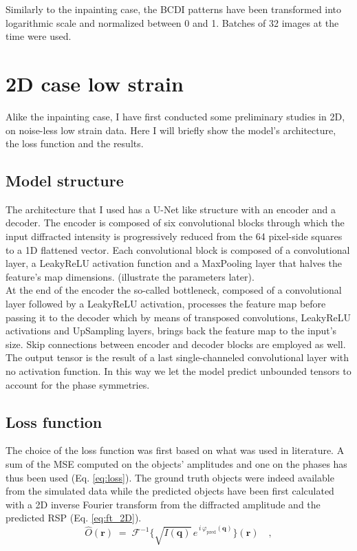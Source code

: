 Similarly to the inpainting case, the BCDI patterns have been transformed into logarithmic scale and normalized between 
0 and 1. Batches of 32 images at the time were used. 

\section{2D case low strain}\label{chp:2d_nostrain}
Alike the inpainting case, I have first conducted some preliminary studies in 2D, on noise-less low strain data. Here I will 
briefly show the model's architecture, the loss function and the results. 
\subsection{Model structure}
The architecture that I used has a U-Net like structure with an encoder and a decoder. 
The encoder is composed of six convolutional blocks through which the input diffracted intensity is progressively 
reduced from the 64 pixel-side squares to a 1D flattened vector. Each convolutional block is composed of a convolutional 
layer, a LeakyReLU activation function and a MaxPooling layer that halves the feature's map dimensions. (illustrate the 
parameters later). \\
At the end of the encoder the so-called bottleneck, composed of a convolutional layer followed by a LeakyReLU activation, 
processes the feature map before passing it to the decoder which by means of transposed convolutions, LeakyReLU activations 
and UpSampling layers, brings back the feature map to the input's size. Skip connections between encoder and decoder blocks 
are employed as well. The output tensor is the result of a last single-channeled convolutional layer with no activation function. 
In this way we let the model predict unbounded tensors to account for the phase symmetries. 

\subsection{Loss function}
The choice of the loss function was first based on what was used in literature. 
A sum of the MSE computed on the objects' amplitudes and one on the phases has thus been used (Eq. \ref{eq:loss}). The ground truth 
objects were indeed available from the simulated data while the predicted objects have been first calculated with a 2D  
inverse Fourier transform from the diffracted amplitude and the predicted RSP (Eq. \ref{eq:ft_2D}). 
\begin{equation}
    \hat{O}(\mathbf{r})
    \;=\;
    \mathcal{F}^{-1}\!\bigl\{\sqrt{I(\mathbf{q})}\,e^{\,i\,\varphi_{\mathrm{pred}}(\mathbf{q})}\bigr\}(\mathbf{r})
    \quad,
    \label{eq:ft_2D}
\end{equation}

